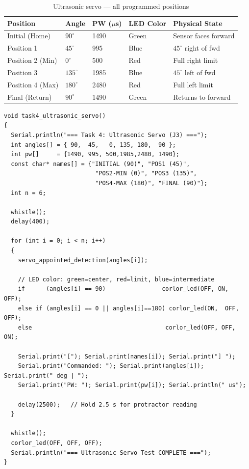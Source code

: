 \documentclass[12pt,a4paper]{article}
\begin{document}
\begin{table}[h!]
\centering
\caption{Ultrasonic servo --- all programmed positions}
\renewcommand{\arraystretch}{1.3}
\begin{tabular}{L{2.5cm} C{1.5cm} C{1.8cm} C{2cm} L{3.5cm}}
\toprule
{}
\color{white}\textbf{Position} &
\color{white}\textbf{Angle} &
\color{white}\textbf{PW ($\mu$s)} &
\color{white}\textbf{LED Color} &
\color{white}\textbf{Physical State} \\
\midrule
Initial (Home) & $90^\circ$ & 1490 & Green & Sensor faces forward \\
Position 1 & $45^\circ$ & 995 & Blue & $45^\circ$ right of fwd \\
Position 2 (Min) & $0^\circ$ & 500 & Red & Full right limit \\
Position 3 & $135^\circ$ & 1985 & Blue & $45^\circ$ left of fwd \\
Position 4 (Max) & $180^\circ$ & 2480 & Red & Full left limit \\
Final (Return) & $90^\circ$ & 1490 & Green & Returns to forward \\
\bottomrule
\end{tabular}
\end{table}

\begin{lstlisting}[style=arduino,caption={Task 4 --- Ultrasonic servo: initial, 4 positions, final with logging}]
void task4_ultrasonic_servo()
{
  Serial.println("=== Task 4: Ultrasonic Servo (J3) ===");
  int angles[] = { 90,  45,   0, 135, 180,  90 };
  int pw[]     = {1490, 995, 500,1985,2480, 1490};
  const char* names[] = {"INITIAL (90)", "POS1 (45)",
                          "POS2-MIN (0)", "POS3 (135)",
                          "POS4-MAX (180)", "FINAL (90)"};
  int n = 6;

  whistle();
  delay(400);

  for (int i = 0; i < n; i++)
  {
    servo_appointed_detection(angles[i]);

    // LED color: green=center, red=limit, blue=intermediate
    if      (angles[i] == 90)                corlor_led(OFF, ON,  OFF);
    else if (angles[i] == 0 || angles[i]==180) corlor_led(ON,  OFF, OFF);
    else                                      corlor_led(OFF, OFF, ON);

    Serial.print("["); Serial.print(names[i]); Serial.print("] ");
    Serial.print("Commanded: "); Serial.print(angles[i]); Serial.print(" deg | ");
    Serial.print("PW: "); Serial.print(pw[i]); Serial.println(" us");

    delay(2500);   // Hold 2.5 s for protractor reading
  }

  whistle();
  corlor_led(OFF, OFF, OFF);
  Serial.println("=== Ultrasonic Servo Test COMPLETE ===");
}
\end{lstlisting}
\end{document}

